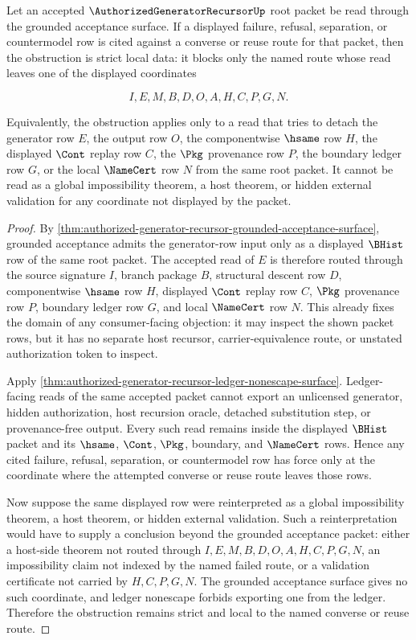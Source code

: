 \begin{corollary}
\label{cor:authorized-generator-recursor-grounded-acceptance-strict-obstruction}
Let an accepted $\AuthorizedGeneratorRecursorUp$ root packet be read through the grounded acceptance surface. If a displayed failure, refusal, separation, or countermodel row is cited against a converse or reuse route for that packet, then the obstruction is strict local data: it blocks only the named route whose read leaves one of the displayed coordinates

$$
I,E,M,B,D,O,A,H,C,P,G,N.
$$

Equivalently, the obstruction applies only to a read that tries to detach the generator row $E$, the output row $O$, the componentwise $\hsame$ row $H$, the displayed $\Cont$ replay row $C$, the $\Pkg$ provenance row $P$, the boundary ledger row $G$, or the local $\NameCert$ row $N$ from the same root packet. It cannot be read as a global impossibility theorem, a host theorem, or hidden external validation for any coordinate not displayed by the packet.
\end{corollary}
\begin{proof}
By \autoref{thm:authorized-generator-recursor-grounded-acceptance-surface}, grounded acceptance admits the generator-row input only as a displayed $\BHist$ row of the same root packet. The accepted read of $E$ is therefore routed through the source signature $I$, branch package $B$, structural descent row $D$, componentwise $\hsame$ row $H$, displayed $\Cont$ replay row $C$, $\Pkg$ provenance row $P$, boundary ledger row $G$, and local $\NameCert$ row $N$. This already fixes the domain of any consumer-facing objection: it may inspect the shown packet rows, but it has no separate host recursor, carrier-equivalence route, or unstated authorization token to inspect.

Apply \autoref{thm:authorized-generator-recursor-ledger-nonescape-surface}. Ledger-facing reads of the same accepted packet cannot export an unlicensed generator, hidden authorization, host recursion oracle, detached substitution step, or provenance-free output. Every such read remains inside the displayed $\BHist$ packet and its $\hsame$, $\Cont$, $\Pkg$, boundary, and $\NameCert$ rows. Hence any cited failure, refusal, separation, or countermodel row has force only at the coordinate where the attempted converse or reuse route leaves those rows.

Now suppose the same displayed row were reinterpreted as a global impossibility theorem, a host theorem, or hidden external validation. Such a reinterpretation would have to supply a conclusion beyond the grounded acceptance packet: either a host-side theorem not routed through $I,E,M,B,D,O,A,H,C,P,G,N$, an impossibility claim not indexed by the named failed route, or a validation certificate not carried by $H,C,P,G,N$. The grounded acceptance surface gives no such coordinate, and ledger nonescape forbids exporting one from the ledger. Therefore the obstruction remains strict and local to the named converse or reuse route.
\end{proof}
